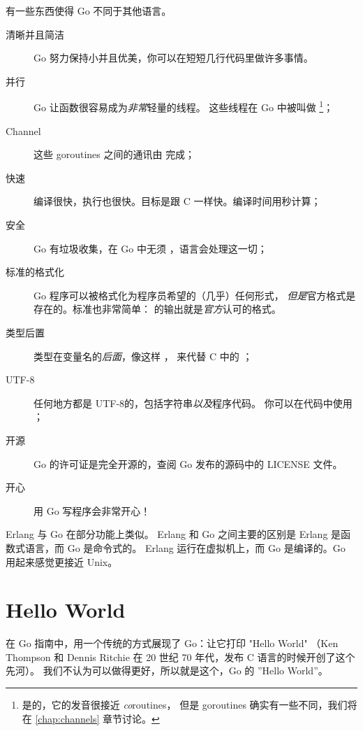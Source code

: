 \noindent{}有一些东西使得 Go 不同于其他语言。
\begin{description}
\item[清晰并且简洁]
Go 努力保持小并且优美，你可以在短短几行代码里做许多事情。

\item[并行]
Go 让函数很容易成为\emph{非常}轻量的线程。
这些线程在 Go 中被叫做  
\footnote{是的，它的发音很接近 \emph{co}routines，
但是 goroutines 确实有一些不同，我们将在 \ref{chap:channels} 章节讨论。}；

\item[Channel]
这些 goroutines 之间的通讯由
 \cite{csp}\cite{hoare} 完成；

\item[快速]
编译很快，执行也很快。目标是跟 C 一样快。编译时间用秒计算；

\item[安全]
Go 有垃圾收集，在 Go 中无须 ，语言会处理这一切；

\item[标准的格式化]
Go 程序可以被格式化为程序员希望的（几乎）任何形式，
\emph{但是}官方格式是存在的。标准也非常简单：
 的输出就是\emph{官方}认可的格式。

\item[类型后置]
类型在变量名的\emph{后面}，像这样 ，
来代替 C 中的 ；

\item[UTF-8]
任何地方都是 UTF-8的，包括字符串\emph{以及}程序代码。 
你可以在代码中使用 ；

\item[开源]
Go 的许可证是完全开源的，查阅 Go 发布的源码中的 LICENSE 文件。

\item[开心]
用 Go 写程序会非常开心！

\end{description}
Erlang \cite{erlang} 与 Go 在部分功能上类似。
Erlang 和 Go 之间主要的区别是 Erlang 是函数式语言，而 Go 是命令式的。
Erlang 运行在虚拟机上，而 Go 是编译的。Go 用起来感觉更接近 Unix。

\section{Hello World}
\label{sec:hello world}
在 Go 指南中，用一个传统的方式展现了 Go：让它打印 "Hello World"
（Ken Thompson 和 Dennis Ritchie 在 20 世纪 70 年代，发布 C 语言的时候开创了这个先河）。
我们不认为可以做得更好，所以就是这个，Go 的 ''Hello World''。

